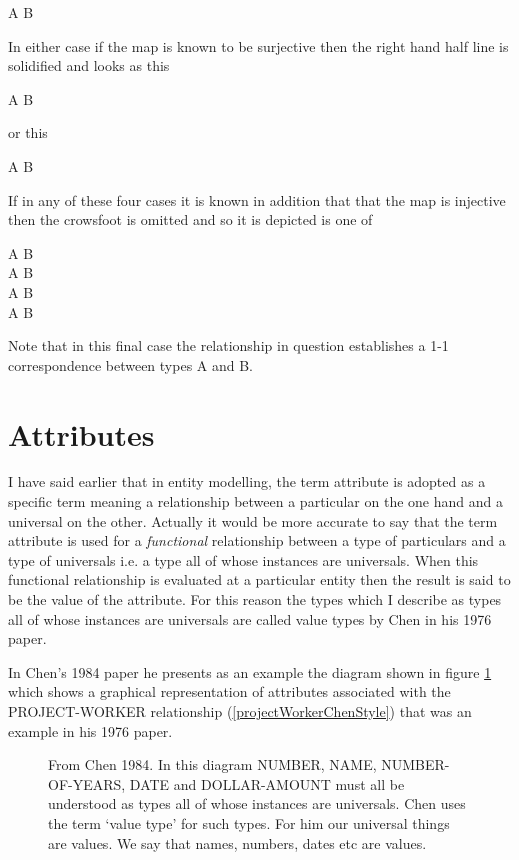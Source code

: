 \begin{center}
A\,\barkerEllisB\,B
\end{center}
In either case if the map is known to be surjective then the right hand half line is solidified and looks as this
\begin{center}
A\,\barkerEllisC\,B
\end{center}
or this
\begin{center}
A\,\barkerEllisD\,B
\end{center}

If in any of these four cases it is known in addition that that the map is injective then the crowsfoot is omitted and so it is depicted is one of
\begin{center}
A\,\barkerEllisE\,B \\
A\,\barkerEllisF\,B \\
A\,\barkerEllisG\,B \\
A\,\barkerEllisH\,B 
\end{center}

Note that in this final case the relationship in question establishes a 1-1 correspondence between types A and B.

\section{Attributes}

\mynote I have said earlier that in entity modelling, the term attribute is adopted as a specific term meaning a relationship between a particular on the one hand and a universal on the other. Actually it would be more accurate to say that the term attribute is used for a \textit{functional} relationship between a type of particulars and a type of universals i.e. a type all of whose instances are universals. When this functional relationship is evaluated at a particular entity then the result is said to be the value of the attribute. For this reason the types which I describe as types all of whose instances are universals are called value types by Chen in his  1976 paper.

\mynote
In Chen's 1984 paper he presents as an example the diagram shown in figure 
\ref{AttributesExampleFromChen1984} which shows a graphical representation of attributes associated with the PROJECT-WORKER relationship (\ref{projectWorkerChenStyle}) that was an example in his 1976 paper.
\begin{figure}

\caption{From Chen 1984. In this diagram NUMBER, NAME, NUMBER-OF-YEARS, DATE and DOLLAR-AMOUNT must all be understood as types all of whose instances are universals. Chen uses the term `value type' for such types. For him our universal things are values. We  say that names, numbers, dates etc are values.}
\label{AttributesExampleFromChen1984}
\end{figure}

